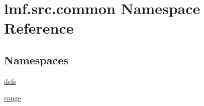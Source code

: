 \hypertarget{namespacelmf_1_1src_1_1common}{\section{lmf.\+src.\+common Namespace Reference}
\label{namespacelmf_1_1src_1_1common}
}
\subsection*{Namespaces}
\begin{DoxyCompactItemize}
\item 
 \hyperlink{namespacelmf_1_1src_1_1common_1_1defs}{defs}
\item 
 \hyperlink{namespacelmf_1_1src_1_1common_1_1range}{range}
\end{DoxyCompactItemize}
